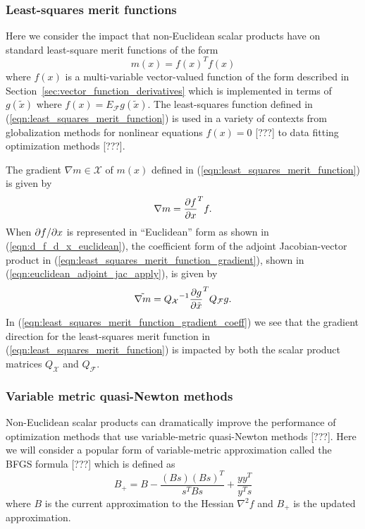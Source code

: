 \subsubsection{Least-squares merit functions}

Here we consider the impact that non-Euclidean scalar products have on
standard least-square merit functions of the form
%
\begin{equation}
m(x) = f(x)^T f(x)
\label{eqn:least_squares_merit_function}
\end{equation}
%
where $f(x)$ is a multi-variable vector-valued function of the form described
in Section~\ref{sec:vector_function_derivatives} which is implemented in terms
of $g(\tilde{x})$ where $f(x) = E_{\mathcal{F}} g(\tilde{x})$.  The
least-squares function defined in (\ref{eqn:least_squares_merit_function}) is
used in a variety of contexts from globalization methods for nonlinear
equations $f(x)=0$ [???] to data fitting optimization methods [???].

The gradient $\nabla m\in\mathcal{X}$ of $m(x)$ defined in
(\ref{eqn:least_squares_merit_function}) is given by
%
\begin{equation}
\nabla m = \displaystyle{\frac{\partial f}{\partial x}}^T f.
\label{eqn:least_squares_merit_function_gradient}
\end{equation}
%
When $\partial f / \partial x$ is represented in ``Euclidean'' form as shown in
(\ref{eqn:d_f_d_x_euclidean}), the coefficient form of the adjoint
Jacobian-vector product in (\ref{eqn:least_squares_merit_function_gradient}),
shown in (\ref{eqn:euclidean_adjoint_jac_apply}), is given by
%
\begin{equation}
\tilde{\nabla m} = {Q_{\mathcal{X}}}^{-1} {\displaystyle{\frac{\partial g}{\partial \tilde{x}}}}^T Q_{\mathcal{F}} g.
\label{eqn:least_squares_merit_function_gradient_coeff}
\end{equation}
%
In (\ref{eqn:least_squares_merit_function_gradient_coeff}) we see that the
gradient direction for the least-squares merit function in
(\ref{eqn:least_squares_merit_function}) is impacted by both the scalar
product matrices $Q_{\mathcal{X}}$ and $Q_{\mathcal{F}}$.

\subsubsection{Variable metric quasi-Newton methods}
\label{sec:variable_metric_quasi_Newton_methods}

Non-Euclidean scalar products can dramatically improve the performance of
optimization methods that use variable-metric quasi-Newton methods [???].
Here we will consider a popular form of variable-metric approximation called
the BFGS formula [???] which is defined as
%
\[
B_+ = B - \frac{(B s) (B s)^T}{s^T B s} + \frac{y y^T}{y^T s}
\label{eqn:bfgs_update}
\]
%
where $B$ is the current approximation to the Hessian $\nabla^2 f$ and $B_+$
is the updated approximation.

